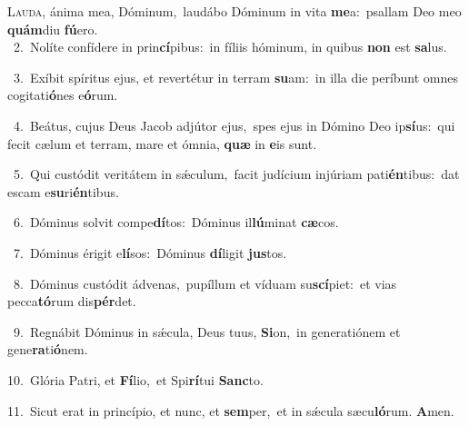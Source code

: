 \lettrine{\initial\textcolor{\initialcolor}{L}}{auda,} ánima mea, Dóminum,~\dagger laudábo Dóminum in vita \textbf{me}\-a:~\star psallam Deo meo \textbf{quám}\-diu \textbf{fú}\-ero.\\
{\numbfont\textcolor{\numbcolor}{~2.}}~Nolíte confídere in prin\-\textbf{cí}\-pibus:~\star in fíliis hóminum, in quibus \textbf{non} est \textbf{sa}\-lus.\par
{\numbfont\textcolor{\numbcolor}{~3.}}~Exíbit spíritus ejus, et revertétur in terram \textbf{su}\-am:~\star in illa die períbunt omnes cogitati\-\textbf{ó}\-nes e\-\textbf{ó}\-rum.\par
{\numbfont\textcolor{\numbcolor}{~4.}}~Beátus, cujus Deus Jacob adjútor ejus,~\dagger spes ejus in Dómino Deo ip\-\textbf{sí}\-us:~\star qui fecit cælum et terram, mare et ómnia, \textbf{quæ} in \textbf{e}\-is sunt.\par
{\numbfont\textcolor{\numbcolor}{~5.}}~Qui custódit veritátem in sǽculum,~\dagger facit judícium injúriam pati\-\textbf{én}\-tibus:~\star dat escam e\-\textbf{su}\-ri\-\textbf{én}\-tibus.\par
{\numbfont\textcolor{\numbcolor}{~6.}}~Dóminus solvit compe\-\textbf{dí}\-tos:~\star Dóminus il\-\textbf{lú}\-minat \textbf{cæ}\-cos.\par
{\numbfont\textcolor{\numbcolor}{~7.}}~Dóminus érigit e\-\textbf{lí}\-sos:~\star Dóminus \textbf{dí}\-ligit \textbf{jus}\-tos.\par
{\numbfont\textcolor{\numbcolor}{~8.}}~Dóminus custódit ádvenas,~\dagger pupíllum et víduam su\-\textbf{scí}\-piet:~\star et vias pecca\-\textbf{tó}\-rum dis\-\textbf{pér}\-det.\par
{\numbfont\textcolor{\numbcolor}{~9.}}~Regnábit Dóminus in sǽcula, Deus tuus, \textbf{Si}\-on,~\star in generatiónem et gene\-\textbf{ra}\-ti\-\textbf{ó}\-nem.\par
{\numbfont\textcolor{\numbcolor}{10.}}~Glória Patri, et \textbf{Fí}\-lio,~\star et Spi\-\textbf{rí}\-tui \textbf{Sanc}\-to.\par
{\numbfont\textcolor{\numbcolor}{11.}}~Sicut erat in princípio, et nunc, et \textbf{sem}\-per,~\star et in sǽcula sæcu\-\textbf{ló}\-rum. \textbf{A}\-men.\par
